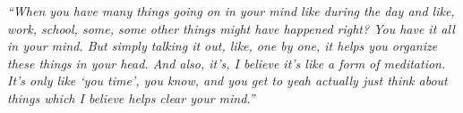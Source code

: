                 \textit{
                ``When you have many things going on in your mind like during the day and like, work, school, some, some other things might have happened right? You have it all in your mind. But simply talking it out, like, one by one, it helps you organize these things in your head. And also, it's, I believe it's like a form of meditation. It's only like `you time', you know, and you get to yeah actually just think about things which I believe helps clear your mind.'' 
                }
            
            
            
            
